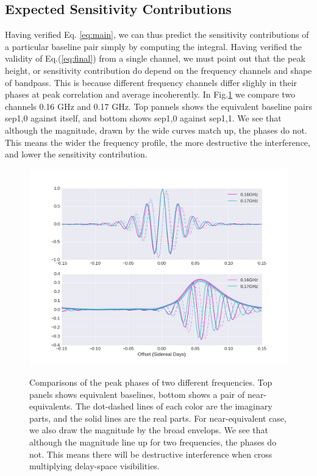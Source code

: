 \documentclass[preprint2,numberedappendix,tighten,twocolappendix]{aastex6}  %
\renewcommand\[{\begin{equation}}
\renewcommand\]{\end{equation}}
\begin{document}
\subsection{Expected Sensitivity Contributions}
Having verified Eq. \eqref{eq:main}, we can thus predict the sensitivity contributions of a
particular baseline pair simply by computing the integral.
Having verified the validity of Eq.(\ref{eq:final}) from a single channel, we must point out that the peak height, or sensitivity contribution do depend on the frequency channels and shape of bandpass. This is because different frequency channels differ slighly in their phases at peak correlation and average incoherently. In Fig.\ref{fig:freqdiff} we compare two channels 0.16 GHz and 0.17 GHz. Top pannels shows the equivalent baseline pairs sep1,0 against itself, and bottom shows sep1,0 against sep1,1. We see that although the magnitude, drawn by the wide curves match up, the phases do not. This means the wider the frequency profile, the more destructive the interference, and lower the sensitivity contribution. 
\begin{figure}[H]
\includegraphics[width=\linewidth]{freqdiff}
\label{fig:freqdiff}
\caption{Comparisons of the peak phases of two different frequencies. Top panels shows equivalent baselines, bottom shows a pair of near-equivalents. The dot-dashed lines of each color are the imaginary parts, and the solid lines are the real parts. For near-equivalent case, we also draw the magnitude by the broad envelops. We see that although the magnitude line up for two frequencies, the phases do not. This means there will be destructive interference when cross multiplying delay-space visibilities. }
\end{figure}
\end{document}
